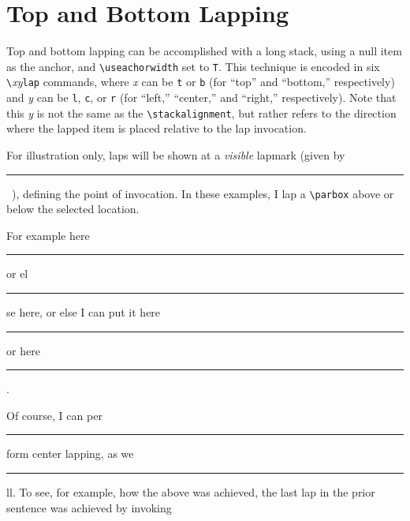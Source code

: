 \documentclass{article}
\let\vb\verb
\def\lapmark{\rule[-.3\baselineskip]{.1ex}{\baselineskip}}
\begin{document}
\section{Top and Bottom Lapping\label{s:lap}}
\def\stackalignment{c}
\def\stacktype{L}%
Top and bottom lapping can be accomplished with a long stack, using a null
item as the anchor, and \vb|\useachorwidth| set to \vb|T|.  This
technique is encoded in six \vb|\|\textit{xy}\vb|lap| commands,
where \textit{x} can be \vb|t| or \vb|b| (for ``top'' and
``bottom,'' respectively) and \textit{y} can be \vb|l|, \vb|c|, or
\vb|r| (for ``left,'' ``center,'' and ``right,'' respectively).  Note
that this \textit{y} is not the same as the \vb|\stackalignment|, but
rather refers to the direction where the lapped item is placed relative
to the lap invocation.

For illustration only, laps will be shown at a \textit{visible} lapmark
(given by \lapmark~), defining the point of invocation.  In these
examples, I lap a \vb|\parbox| above or below the selected location.

\begin{myverbbox}{\bll}\bllap\end{myverbbox}
\begin{myverbbox}{\brl}\brlap\end{myverbbox}
\begin{myverbbox}{\tll}\tllap\end{myverbbox}
\begin{myverbbox}{\trl}\trlap\end{myverbbox}
\begin{myverbbox}{\bcl}\bclap\end{myverbbox}
\begin{myverbbox}{\tcl}\tclap\end{myverbbox}
For example here\lapmark%
or el\lapmark%
%
se here, or else I can put it here\lapmark%
or here\lapmark%
%
.\

Of course, I can per\lapmark
{}%
form center lapping, as we\lapmark%
%
ll.
To see, for example, how the above was achieved, the last lap in the
prior sentence was achieved by invoking
\end{document}
